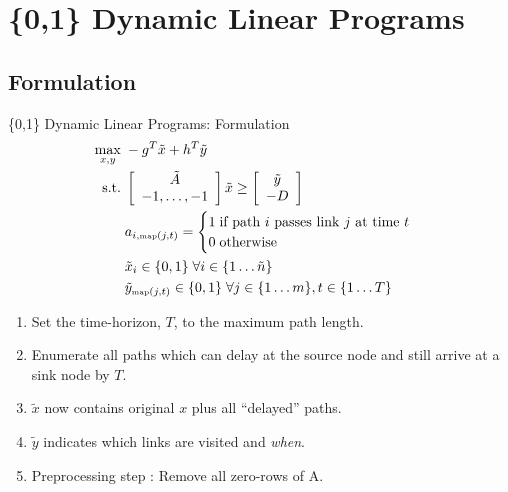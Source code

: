 \documentclass[xcolor=pdflatex,dvipsnames,table]{beamer}
\begin{document}

\section{\{0,1\} Dynamic Linear Programs}
\subsection{Formulation}
\begin{frame}{\{0,1\} Dynamic Linear Programs: Formulation}
\begin{align*}
\max_{x,y}\;& -g^T \tilde{x} + h^T \tilde{y} \\
\mbox{s.t.}\;& \left[ \begin{array}{c}
                       \tilde{A}\\
                       -1, \dots, -1
                      \end{array}\right] \tilde{x} \geq \left[ \begin{array}{c} \tilde{y}\\-D \end{array}\right] \\
&a_{i,\mbox{\tiny map}(j,t)} = \begin{cases}
           1\;\mbox{if path $i$ passes link $j$ at time $t$}\\
           0\;\mbox{otherwise}
          \end{cases}\\
&\tilde{x}_i \in \{0,1\}\;\forall i\in\{1\dots \tilde{n}\}\\
&\tilde{y}_{\mbox{\tiny map}(j,t)} \in \{0,1\}\;\forall j\in\{1\dots m\},t\in\{1\dots T\}
\end{align*}

\begin{enumerate}
\small
\item Set the time-horizon, $T$, to the maximum path length.
\item Enumerate all paths which can delay at the source node and still arrive at a sink node by $T$. 
\item $\tilde{x}$ now contains original $x$ plus all ``delayed'' paths.
\item $\tilde{y}$ indicates which links are visited and \emph{when}.
\item Preprocessing step : Remove all zero-rows of A.
\end{enumerate}
\end{frame}
\end{document}
